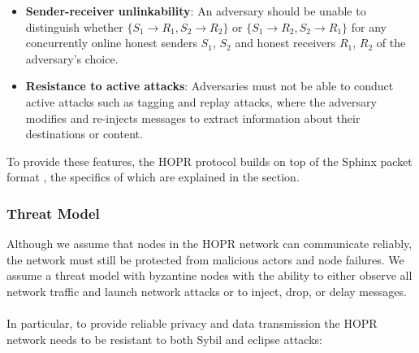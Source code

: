 \begin{itemize}

    \item \textbf{Sender-receiver unlinkability}: An adversary should be unable
        to distinguish whether $\{S_1\rightarrow R_1, S_2\rightarrow R_2\}$ or
        $\{S_1\rightarrow R_2, S_2\rightarrow R_1\}$ for any concurrently online
        honest senders $S_1$, $S_2$ and honest receivers $R_1$, $R_2$ of the
        adversary’s choice.

    \item \textbf{Resistance to active attacks}: Adversaries must not be able to conduct active attacks
        such as tagging and replay attacks, where the adversary modifies and
        re-injects messages to extract information about their destinations or
        content.

\end{itemize}
To provide these features, the HOPR protocol builds on top of the Sphinx packet format \cite{sphinxpaper}, the specifics of which are explained
in the  section.


\subsubsection{Threat Model}

Although we assume that nodes in the HOPR network can communicate reliably, the
network must still be protected from malicious actors and node failures. We assume a
threat model with byzantine nodes with the ability to either observe all network
traffic and launch network attacks or to inject, drop, or delay messages. \\~\\In particular, to provide reliable privacy and data transmission the HOPR network needs to be resistant to both Sybil and eclipse attacks:

